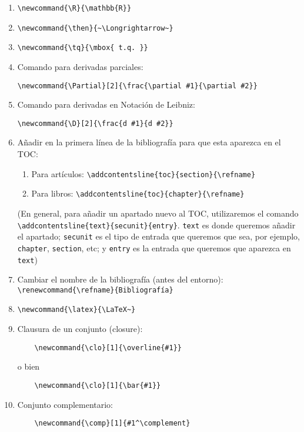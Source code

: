 \documentclass[11pt,a4paper]{article}
\begin{document}
\begin{enumerate}

\item \verb|\newcommand{\R}{\mathbb{R}}|

\item \verb|\newcommand{\then}{~\Longrightarrow~}|

\item \verb|\newcommand{\tq}{\mbox{ t.q. }}|

\item Comando para derivadas parciales:
\begin{verbatim}
\newcommand{\Partial}[2]{\frac{\partial #1}{\partial #2}}
\end{verbatim}

\item Comando para derivadas en Notación de Leibniz:
\begin{verbatim}
\newcommand{\D}[2]{\frac{d #1}{d #2}}
\end{verbatim}

\item Añadir en la primera línea de la bibliografía para que esta aparezca en el TOC:
	\begin{enumerate}
		\item Para artículos: \verb|\addcontentsline{toc}{section}{\refname}|
		\item Para libros: \verb|\addcontentsline{toc}{chapter}{\refname}|
	\end{enumerate}
	(En general, para añadir un apartado nuevo al TOC, utilizaremos el comando \linebreak \verb|\addcontentsline{text}{secunit}{entry}|. \texttt{text} es donde queremos añadir el apartado; \texttt{secunit} es el tipo de entrada que queremos que sea, por ejemplo, \texttt{chapter}, \texttt{section}, etc; y \texttt{entry} es la entrada que queremos que aparezca en \texttt{text})

\item Cambiar el nombre de la bibliografía (antes del entorno):\\
\verb|\renewcommand{\refname}{Bibliografía}|

\item \verb|\newcommand{\latex}{\LaTeX~}|

\item Clausura de un conjunto (closure):
\begin{verbatim}
	\newcommand{\clo}[1]{\overline{#1}}
\end{verbatim}
o bien
\begin{verbatim}
	\newcommand{\clo}[1]{\bar{#1}}
\end{verbatim}

\item Conjunto complementario:
\begin{verbatim}
	\newcommand{\comp}[1]{#1^\complement}
\end{verbatim}

\end{enumerate}
\end{document}
